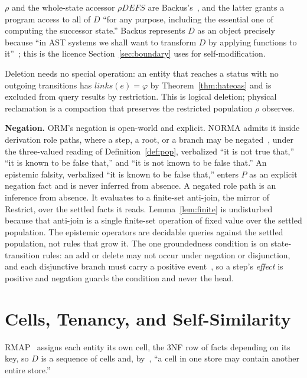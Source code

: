\documentclass[10pt,twocolumn]{article}
\theoremstyle{plain}
\theoremstyle{definition}
\begin{document}
\smallskip\noindent $\rho$ and the whole-state accessor $\rho\mathit{DEFS}$ are Backus's~\cite[Secs.\,13.3,\,14.3.3]{backus78}, and the latter grants a program access to all of $D$ ``for any purpose, including the essential one of computing the successor state.'' Backus represents $D$ as an object precisely because ``in AST systems we shall want to transform $D$ by applying functions to it''~\cite[Sec.\,13.5]{backus78}; this is the licence Section~\ref{sec:boundary} uses for self-modification.

\smallskip\noindent Deletion needs no special operation: an entity that reaches a status with no outgoing transitions has $\mathit{links}(e)=\varphi$ by Theorem~\ref{thm:hateoas} and is excluded from query results by restriction. This is logical deletion; physical reclamation is a compaction that preserves the restricted population $\rho$ observes.

\smallskip\noindent\textbf{Negation.} ORM's negation is open-world and explicit. NORMA admits it inside derivation role paths, where a step, a root, or a branch may be negated~\cite{norma}, under the three-valued reading of Definition~\ref{def:pop}, verbalized ``it is not true that,'' ``it is known to be false that,'' and ``it is not known to be false that.'' An epistemic falsity, verbalized ``it is known to be false that,'' enters $P$ as an explicit negation fact and is never inferred from absence. A negated role path is an inference from absence. It evaluates to a finite-set anti-join, the mirror of Restrict, over the settled facts it reads. Lemma~\ref{lem:finite} is undisturbed because that anti-join is a single finite-set operation of fixed value over the settled population. The epistemic operators are decidable queries against the settled population, not rules that grow it. The one groundedness condition is on state-transition rules: an add or delete may not occur under negation or disjunction, and each disjunctive branch must carry a positive event~\cite{norma}, so a step's \emph{effect} is positive and negation guards the condition and never the head.


\section{Cells, Tenancy, and Self-Similarity}\label{sec:cells}

RMAP~\cite{halpin08} assigns each entity its own cell, the 3NF row of facts depending on its key, so $D$ is a sequence of cells and, by~\cite[Sec.\,14.7]{backus78}, ``a cell in one store may contain another entire store.''
\end{document}
